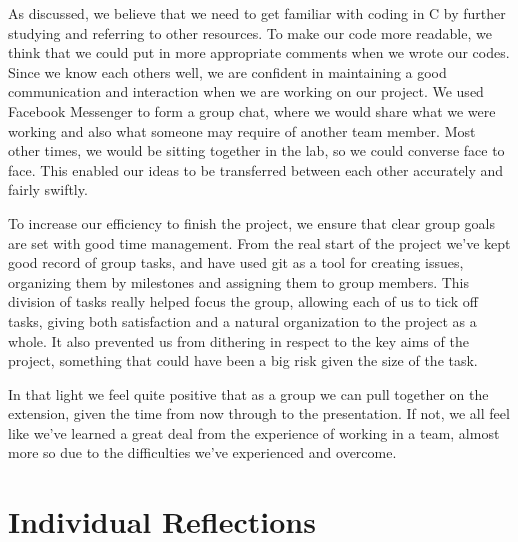 \documentclass[9pt]{article}
\begin{document}
As discussed, we believe that we need to get familiar with coding in C by further studying and referring to other resources. To make our code more readable, we think that we could put in more appropriate comments when we wrote our codes. Since we know each others well, we are confident in maintaining a good communication and interaction when we are working on our project. We used Facebook Messenger to form a group chat, where we would share what we were working and also what someone may require of another team member. Most other times, we would be sitting together in the lab, so we could converse face to face. This enabled our ideas to be transferred between each other accurately and fairly swiftly.

To increase our efficiency to finish the project, we ensure that clear group goals are set with good time management. From the real start of the project we've kept good record of group tasks, and have used git as a tool for creating issues, organizing them by milestones and assigning them to group members. This division of tasks really helped focus the group, allowing each of us to tick off tasks, giving both satisfaction and a natural organization to the project as a whole. It also prevented us from dithering in respect to the key aims of the project, something that could have been a big risk given the size of the task.

In that light we feel quite positive that as a group we can pull together on the extension, given the time from now through to the presentation. If not, we all feel like we've learned a great deal from the experience of working in a team, almost more so due to the difficulties we've experienced and overcome.

\pagebreak

\section{Individual Reflections}
\end{document}
